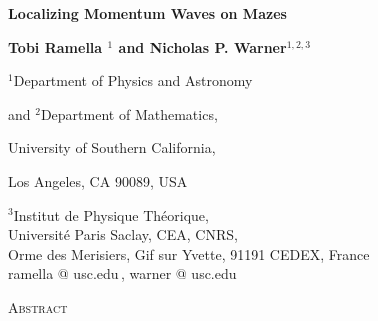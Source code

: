 \documentclass[11pt]{article}
\numberwithin{equation}{section}
\begin{document}
\phantom{AAA}
\vspace{-10mm}



\vspace{1.9cm}

\begin{center}

{\huge {\bf   Localizing Momentum Waves on Mazes  }}\\


{\huge {\bf \vspace*{.25cm}  }}



\vspace{1cm}

{\large{\bf { Tobi Ramella $^{1}$  and  Nicholas P. Warner$^{1,2,3}$}}}

\vspace{1cm}

\centerline{$^1$Department of Physics and Astronomy}
\centerline{and $^2$Department of Mathematics,}
\centerline{University of Southern California,} 
\centerline{Los Angeles, CA 90089, USA}

\vspace{1cm}

$^3$Institut de Physique Th\'eorique, \\
Universit\'e Paris Saclay, CEA, CNRS,\\
Orme des Merisiers, Gif sur Yvette, 91191 CEDEX, France \\[12pt]

\vspace{10mm} 
%
{\footnotesize\upshape\ttfamily  ramella  @ usc.edu\,, \quad  warner @ usc.edu} \\



\vspace{1.5cm}
 
\textsc{Abstract}

\end{center}
\end{document}
